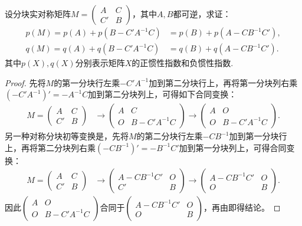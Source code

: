 \documentclass[../../main.tex]{subfiles}
\begin{document}
\begin{proposition}[正负惯性指数的降阶公式]\label{proposition:正负惯性指数的降阶公式}
设分块实对称矩阵\(M = \begin{pmatrix}
A & C \\
C' & B
\end{pmatrix}\)，其中\(A,B\)都可逆，求证：
\begin{align*}
p(M)=p(A)+p(B - C'A^{-1}C)&=p(B)+p(A - CB^{-1}C'),\\
q(M)=q(A)+q(B - C'A^{-1}C)&=q(B)+q(A - CB^{-1}C').
\end{align*}
其中$p(X),q(X)$分别表示矩阵$X$的正惯性指数和负惯性指数.
\end{proposition}
\begin{proof}
先将\(M\)的第一分块行左乘\(-C'A^{-1}\)加到第二分块行上，再将第一分块列右乘\((-C'A^{-1})'=-A^{-1}C\)加到第二分块列上，可得如下合同变换：
\begin{align*}
M = \begin{pmatrix}
A & C \\
C' & B
\end{pmatrix}
&\rightarrow\begin{pmatrix}
A & C \\
O & B - C'A^{-1}C
\end{pmatrix}
\rightarrow\begin{pmatrix}
A & O \\
O & B - C'A^{-1}C
\end{pmatrix}.
\end{align*}
另一种对称分块初等变换是，先将\(M\)的第二分块行左乘\(-CB^{-1}\)加到第一分块行上，再将第二分块列右乘\((-CB^{-1})'=-B^{-1}C'\)加到第一分块列上，可得合同变换：
\begin{align*}
M = \begin{pmatrix}
A & C \\
C' & B
\end{pmatrix}
&\rightarrow\begin{pmatrix}
A - CB^{-1}C' & O \\
C' & B
\end{pmatrix}
\rightarrow\begin{pmatrix}
A - CB^{-1}C' & O \\
O & B
\end{pmatrix}.
\end{align*}
因此\(\begin{pmatrix}
A & O \\
O & B - C'A^{-1}C
\end{pmatrix}\)合同于\(\begin{pmatrix}
A - CB^{-1}C' & O \\
O & B
\end{pmatrix}\)，再由即得结论。

\end{proof} 
\end{document}
